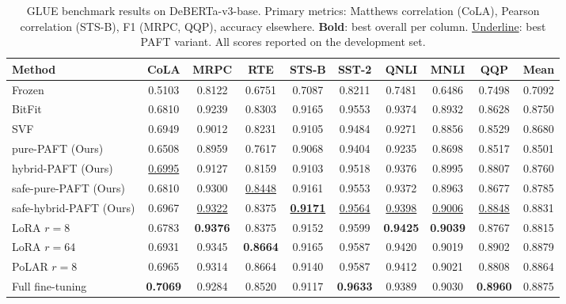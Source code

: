 \begin{table}[t]
\centering
\small
\caption{GLUE benchmark results on DeBERTa-v3-base. Primary metrics: Matthews correlation (CoLA), Pearson correlation (STS-B), F1 (MRPC, QQP), accuracy elsewhere. \textbf{Bold}: best overall per column. \underline{Underline}: best PAFT variant. All scores reported on the development set.}
\label{tab:glue_performance}
\begin{tabular}{lccccccccc}
\toprule
\textbf{Method} & \textbf{CoLA} & \textbf{MRPC} & \textbf{RTE} & \textbf{STS-B} & \textbf{SST-2} & \textbf{QNLI} & \textbf{MNLI} & \textbf{QQP} & \textbf{Mean} \\
\midrule
Frozen & 0.5103 & 0.8122 & 0.6751 & 0.7087 & 0.8211 & 0.7481 & 0.6486 & 0.7498 & 0.7092 \\
\midrule
BitFit & 0.6810 & 0.9239 & 0.8303 & 0.9165 & 0.9553 & 0.9374 & 0.8932 & 0.8628 & 0.8750 \\
SVF & 0.6949 & 0.9012 & 0.8231 & 0.9105 & 0.9484 & 0.9271 & 0.8856 & 0.8529 & 0.8680 \\
\midrule
pure-PAFT (Ours) & 0.6508 & 0.8959 & 0.7617 & 0.9068 & 0.9404 & 0.9235 & 0.8698 & 0.8517 & 0.8501 \\
hybrid-PAFT (Ours) & \underline{0.6995} & 0.9127 & 0.8159 & 0.9103 & 0.9518 & 0.9376 & 0.8995 & 0.8807 & 0.8760 \\
safe-pure-PAFT (Ours) & 0.6810 & 0.9300 & \underline{0.8448} & 0.9161 & 0.9553 & 0.9372 & 0.8963 & 0.8677 & 0.8785 \\
safe-hybrid-PAFT (Ours) & 0.6967 & \underline{0.9322} & 0.8375 & \textbf{\underline{0.9171}} & \underline{0.9564} & \underline{0.9398} & \underline{0.9006} & \underline{0.8848} & 0.8831 \\
\midrule
LoRA $r{=}8$ & 0.6783 & \textbf{0.9376} & 0.8375 & 0.9152 & 0.9599 & \textbf{0.9425} & \textbf{0.9039} & 0.8767 & 0.8815 \\
LoRA $r{=}64$ & 0.6931 & 0.9345 & \textbf{0.8664} & 0.9165 & 0.9587 & 0.9420 & 0.9019 & 0.8902 & 0.8879 \\
PoLAR $r{=}8$ & 0.6965 & 0.9314 & 0.8664 & 0.9140 & 0.9587 & 0.9412 & 0.9021 & 0.8808 & 0.8864 \\
\midrule
Full fine-tuning & \textbf{0.7069} & 0.9284 & 0.8520 & 0.9117 & \textbf{0.9633} & 0.9389 & 0.9030 & \textbf{0.8960} & 0.8875 \\
\bottomrule
\end{tabular}
\end{table}